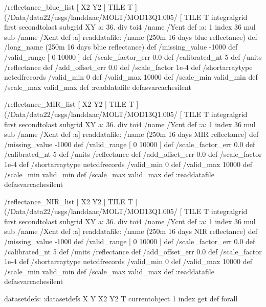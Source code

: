 \begin{ingrid}
/reflectance_blue_list
{
[ X2 Y2 | TILE T ]
(/Data/data22/usgs/landdaac/MOLT/MOD13Q1.005/%
 [ TILE T integralgrid first secondtolast subgrid
XY
  a:
    36. div
    toi4
    /name /Ycnt def
    :a: 1 index
      36 mul
      sub
     /name /Xcnt def
     :a] 
readdatafile:
/name (250m 16 days blue reflectance) def
 /long_name (250m 16 days blue reflectance) def
 /missing_value -1000 def
 /valid_range [ 0 10000 ] def
 /scale_factor_err 0.0 def
  /calibrated_nt 5 def
 /units /reflectance def
 /add_offset_err 0.0 def
 /scale_factor 1e-4 def
/shortarraytype netcdfrecords
/valid_min 0 def
/valid_max 10000 def
/scale_min valid_min def
/scale_max valid_max def
:readdatafile
} defasvarcachesilent
\end{ingrid}
\begin{ingrid}
/reflectance_MIR_list
{
[ X2 Y2 | TILE T ]
(/Data/data22/usgs/landdaac/MOLT/MOD13Q1.005/%
 [ TILE T integralgrid first secondtolast subgrid
XY
  a:
    36. div
    toi4
    /name /Ycnt def
    :a: 1 index
      36 mul
      sub
     /name /Xcnt def
     :a] 
readdatafile:
/name (250m 16 days MIR reflectance) def
 /missing_value -1000 def
 /valid_range [ 0 10000 ] def
 /scale_factor_err 0.0 def
  /calibrated_nt 5 def
 /units /reflectance def
 /add_offset_err 0.0 def
 /scale_factor 1e-4 def
/shortarraytype netcdfrecords
/valid_min 0 def
/valid_max 10000 def
/scale_min valid_min def
/scale_max valid_max def
:readdatafile
} defasvarcachesilent
\end{ingrid}
\begin{ingrid}
/reflectance_NIR_list
{
[ X2 Y2 | TILE T ]
(/Data/data22/usgs/landdaac/MOLT/MOD13Q1.005/%
 [ TILE T integralgrid first secondtolast subgrid
XY
  a:
    36. div
    toi4
    /name /Ycnt def
    :a: 1 index
      36 mul
      sub
     /name /Xcnt def
     :a] 
readdatafile:
/name (250m 16 days NIR reflectance) def
 /missing_value -1000 def
 /valid_range [ 0 10000 ] def
 /scale_factor_err 0.0 def
  /calibrated_nt 5 def
 /units /reflectance def
 /add_offset_err 0.0 def
 /scale_factor 1e-4 def
/shortarraytype netcdfrecords
/valid_min 0 def
/valid_max 10000 def
/scale_min valid_min def
/scale_max valid_max def
:readdatafile
} defasvarcachesilent
\end{ingrid}
\begin{ingrid}
datasetdefs:
:datasetdefs
{ X Y X2 Y2 T } { currentobject 1 index get def } forall
\end{ingrid}
